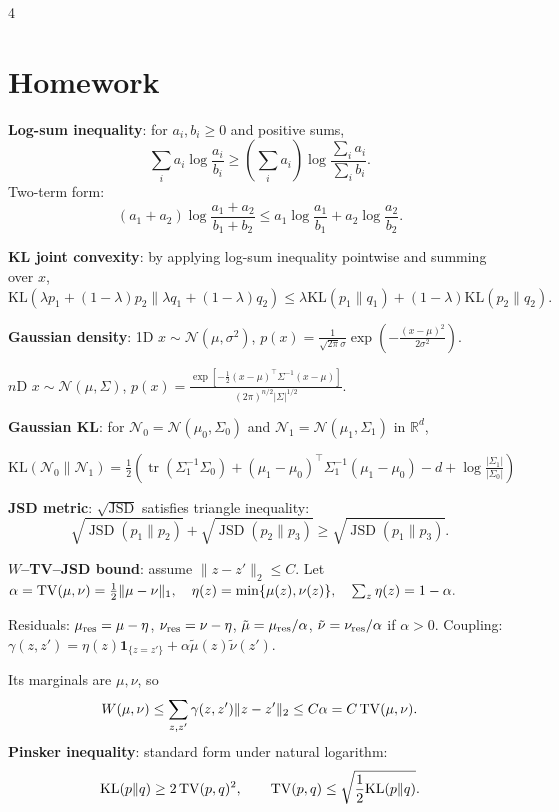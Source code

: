 \documentclass{article}
\newcommand{\key}[1]{\textbf{#1}}
\newcommand{\R}{\mathbb{R}}
\newcommand{\N}{\mathcal{N}}
\newcommand{\KL}{\mathrm{KL}}
\newcommand{\1}{\mathbf 1}
\DeclareMathOperator{\tr}{tr}
\begin{document}
\begin{multicols*}{4}
\section{Homework}
\key{Log-sum inequality}: for $a_i,b_i\ge0$ and positive sums,
\[
\sum_i a_i\log\frac{a_i}{b_i}\ge
\left(\sum_i a_i\right)\log\frac{\sum_i a_i}{\sum_i b_i}.
\]
Two-term form:
\[
(a_1+a_2)\log\frac{a_1+a_2}{b_1+b_2}
\le
a_1\log\frac{a_1}{b_1}+a_2\log\frac{a_2}{b_2}.
\]

\key{KL joint convexity}: by applying log-sum inequality pointwise and summing over $x$,
\(
\KL(\lambda p_1+(1-\lambda)p_2\|\lambda q_1+(1-\lambda)q_2)
\le
\lambda\KL(p_1\|q_1)+(1-\lambda)\KL(p_2\|q_2).
\)

\key{Gaussian density}: 1D $x\sim\N(\mu,\sigma^2)$,
$p(x)=\frac1{\sqrt{2\pi}\sigma}\exp(-\frac{(x-\mu)^2}{2\sigma^2})$.

$n$D $x\sim\N(\mu,\Sigma)$,
$p(x)=\frac{\exp[-\frac12(x-\mu)^\top\Sigma^{-1}(x-\mu)]}{(2\pi)^{n/2}|\Sigma|^{1/2}}$.

\key{Gaussian KL}: for $\N_0=\N(\mu_0,\Sigma_0)$ and $\N_1=\N(\mu_1,\Sigma_1)$ in $\R^d$,

\(
\KL(\N_0\|\N_1)
=\frac12\left(
\tr(\Sigma_1^{-1}\Sigma_0)
+(\mu_1-\mu_0)^\top\Sigma_1^{-1}(\mu_1-\mu_0)
-d+\log\frac{|\Sigma_1|}{|\Sigma_0|}
\right)
\)

\key{JSD metric}: $\sqrt{\operatorname{JSD}}$ satisfies triangle inequality:
\[
\sqrt{\operatorname{JSD}(p_1\|p_2)}
+\sqrt{\operatorname{JSD}(p_2\|p_3)}
\ge
\sqrt{\operatorname{JSD}(p_1\|p_3)}.
\]

\key{$W$--TV--JSD bound}: assume $\|z-z'\|_2\le C$. Let
\(
\alpha={\rm TV}(\mu,\nu)=\frac12\|\mu-\nu\|_1,\quad
\eta(z)=\min\{\mu(z),\nu(z)\},\quad \sum_z\eta(z)=1-\alpha.
\)

Residuals: $\mu_{\rm res}=\mu-\eta$, $\nu_{\rm res}=\nu-\eta$, $\tilde\mu=\mu_{\rm res}/\alpha$, $\tilde\nu=\nu_{\rm res}/\alpha$ if $\alpha>0$. Coupling:
\(
\gamma(z,z')=\eta(z)\mathbf1_{\{z=z'\}}+\alpha\tilde\mu(z)\tilde\nu(z').
\)

Its marginals are $\mu,\nu$, so
\[
W(\mu,\nu)\le\sum_{z,z'}\gamma(z,z')\|z-z'\|_2
\le C\alpha=C\,{\rm TV}(\mu,\nu).
\]
\key{Pinsker inequality}: standard form under natural logarithm:
\[
\KL(p\|q)\ge 2\,{\rm TV}(p,q)^2,
\qquad
{\rm TV}(p,q)\le\sqrt{\frac12\KL(p\|q)}.
\]

\end{multicols*}
\end{document}
